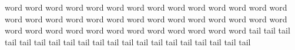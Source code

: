 \documentclass{article}
\begin{document}
word word word word word word word word word word word word word word word word word word word word word word word word word word word word word word word word word word word word word word word word \badcsinlongline tail tail tail tail tail tail tail tail tail tail tail tail tail tail tail tail tail tail tail tail 
\end{document}
